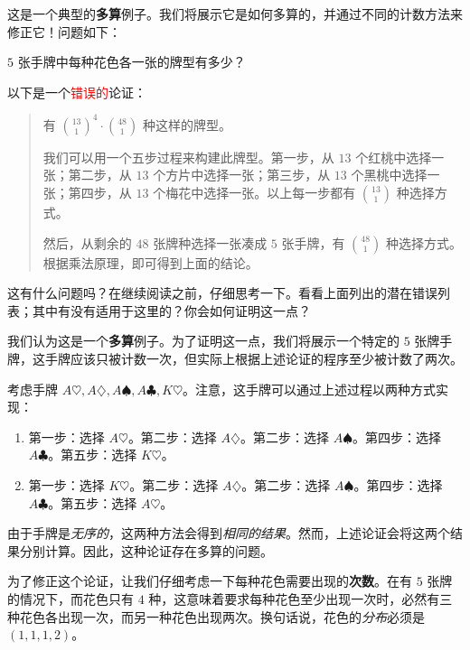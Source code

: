 \begin{example}\label{ex:example8.3.6}
    这是一个典型的\textbf{多算}例子。我们将展示它是如何多算的，并通过不同的计数方法来修正它！问题如下：

    $5$ 张手牌中每种花色各一张的牌型有多少？

    以下是一个\textcolor{red}{错误的}论证：

    \begin{quote}\color{red}
        有 ${13 \choose 1}^4 \cdot {48 \choose 1}$ 种这样的牌型。

        我们可以用一个五步过程来构建此牌型。第一步，从 $13$ 个红桃中选择一张；第二步，从 $13$ 个方片中选择一张；第三步，从 $13$ 个黑桃中选择一张；第四步，从 $13$ 个梅花中选择一张。以上每一步都有 ${13 \choose 1}$ 种选择方式。

        然后，从剩余的 $48$ 张牌种选择一张凑成 $5$ 张手牌，有 ${48 \choose 1}$ 种选择方式。根据乘法原理，即可得到上面的结论。
    \end{quote}


    这有什么问题吗？在继续阅读之前，仔细思考一下。看看上面列出的潜在错误列表；其中有没有适用于这里的？你会如何证明这一点？

    我们认为这是一个\textbf{多算}例子。为了证明这一点，我们将展示一个特定的 $5$ 张牌手牌，这手牌应该只被计数一次，但实际上根据上述论证的程序至少被计数了两次。

    考虑手牌 $A\heartsuit, A\diamondsuit, A\spadesuit, A\clubsuit, K\heartsuit$。注意，这手牌可以通过上述过程以两种方式实现：
    \begin{enumerate}[label=(\arabic*)]
        \item 第一步：选择 $A\heartsuit$。第二步：选择 $A\diamondsuit$。第二步：选择 $A\spadesuit$。第四步：选择 $A\clubsuit$。第五步：选择 $K\heartsuit$。
        \item 第一步：选择 $K\heartsuit$。第二步：选择 $A\diamondsuit$。第二步：选择 $A\spadesuit$。第四步：选择 $A\clubsuit$。第五步：选择 $A\heartsuit$。
    \end{enumerate}
    由于手牌是\emph{无序的}，这两种方法会得到\emph{相同的结果}。然而，上述论证会将这两个结果分别计算。因此，这种论证存在多算的问题。

    为了修正这个论证，让我们仔细考虑一下每种花色需要出现的\textbf{次数}。在有 $5$ 张牌的情况下，而花色只有 $4$ 种，这意味着要求每种花色至少出现一次时，必然有三种花色各出现一次，而另一种花色出现两次。换句话说，花色的\emph{分布}必须是 $(1, 1, 1, 2)$。


\end{example}
